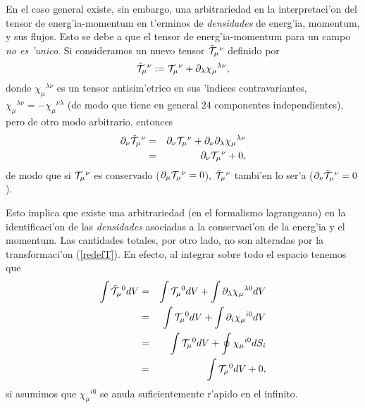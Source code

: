 En el caso general existe, sin embargo, una arbitrariedad en la interpretaci'on
del tensor de energ'ia-momentum en t'erminos de \textit{densidades} de energ'ia,
momentum, y sus flujos. Esto se debe a que el tensor de energ'ia-momentum para
un
campo \textit{no es 'unico}. Si consideramos un nuevo tensor $\tilde{\cal
T}_\mu{}^\nu$ definido por
\begin{equation}
\tilde{\cal T}_\mu{}^\nu:={\cal T}_\mu{}^\nu +\partial_\lambda\chi_\mu{}^{\lambda\nu}, \label{redefT}
\end{equation}
donde $\chi_\mu{}^{\lambda\nu}$ es un tensor antisim'etrico en sus 'indices
contravariantes, $\chi_\mu{}^{\lambda\nu}=-\chi_\mu{}^{\nu\lambda}$ (de modo que
tiene en general $24$ componentes independientes), pero de otro modo arbitrario,
entonces
\begin{eqnarray}
\partial_\nu\tilde{\cal T}_\mu{}^\nu&=&\partial_\nu{\cal T}_\mu{}^\nu
+\partial_\nu\partial_\lambda\chi_\mu{}^{\lambda\nu} \\
&=& \partial_\nu{\cal T}_\mu{}^\nu+ 0,
\end{eqnarray}
de modo que si ${\cal T}_\mu{}^\nu$ es conservado ($\partial_\mu{\cal
T}_\mu{}^\nu=0$), $\tilde{\cal T}_\mu{}^\nu$ tambi'en lo ser'a
($\partial_\nu\tilde{\cal T}_\mu{}^\nu=0$).

Esto implica que existe una arbitrariedad (en el formalismo lagrangeano) en la
identificaci'on de las \textit{densidades} asociadas a la conservaci'on de la
energ'ia y el momentum. Las cantidades totales, por otro lado, no son alteradas
por la transformaci'on (\ref{redefT}). En efecto, al integrar sobre todo el
espacio tenemos que
\begin{eqnarray}
\int \tilde{\cal T}_\mu{}^0 dV&=&\int {\cal T}_\mu{}^0
dV+\int\partial_\lambda\chi_\mu{}^{\lambda 0} dV\\
&=&\int {\cal T}_\mu{}^0 dV+\int \partial_i\chi_\mu{}^{i0} dV\\
&=&\int {\cal T}_\mu{}^0 dV+\oint \chi_\mu{}^{i0}dS_i \\
&=&\int {\cal T}_\mu{}^0 dV+0,
\end{eqnarray}
si asumimos que $\chi_\mu{}^{i0}$ se anula suficientemente r'apido en el
infinito.



